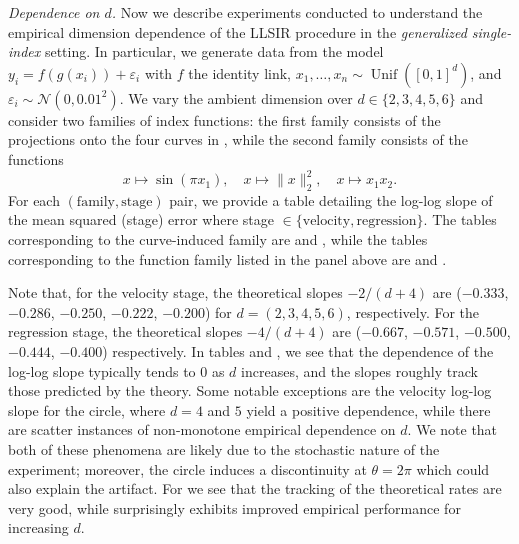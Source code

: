 \documentclass[11pt]{article}
\begin{document}
\emph{Dependence on $d$.} Now we describe experiments conducted to understand the empirical dimension dependence of the LLSIR procedure in the \emph{generalized single-index} setting. In particular, we generate data from the model $y_i = f(g(x_i)) + \varepsilon_i$ with $f$ the identity link, $x_1, \dots, x_n \sim \operatorname{Unif}([0,1]^d)$, and $\varepsilon_i \sim \mathcal{N}(0, 0.01^2)$. We vary the ambient dimension over $d \in \{2, 3, 4, 5, 6\}$ and consider two families of index functions: the first family consists of the projections onto the four curves in , while the second family consists of the functions
\[x \mapsto \sin(\pi x_1), \quad x\mapsto \|x\|_2^2, \quad x \mapsto x_1x_2.\]
For each $(\text{family}, \text{stage})$ pair, we provide a table detailing the log-log slope of the mean squared (stage) error where stage $\in \{\text{velocity}, \text{regression}\}.$ The tables corresponding to the curve-induced family are  and , while the tables corresponding to the function family listed in the panel above are  and . 









Note that, for the velocity stage, the theoretical slopes $-2/(d+4)$ are ($-0.333$, $-0.286$, $-0.250$, $-0.222$, $-0.200$) for $d=(2,3,4,5,6)$, respectively. For the regression stage, the theoretical slopes $-4/(d+4)$ are ($-0.667$, $-0.571$, $-0.500$, $-0.444$, $-0.400$) respectively. In tables  and , we see that the dependence of the log-log slope typically tends to $0$ as $d$ increases, and the slopes roughly track those predicted by the theory. Some notable exceptions are the velocity log-log slope for the circle, where $d = 4$ and $5$ yield a positive dependence, while there are scatter instances of non-monotone empirical dependence on $d$. We note that both of these phenomena are likely due to the stochastic nature of the experiment; moreover, the circle induces a discontinuity at $\theta = 2\pi$ which could also explain the artifact. For  we see that the tracking of the theoretical rates are very good, while  surprisingly exhibits improved empirical performance for increasing $d$. 
\medskip
\end{document}
